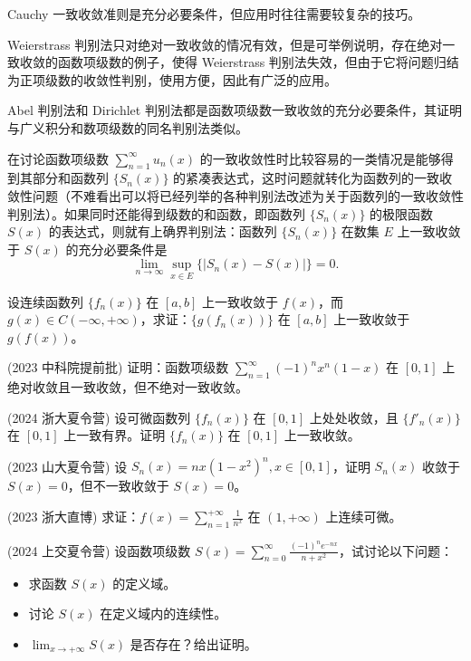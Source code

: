 \documentclass[lang=cn,10pt,thmcnt=section]{elegantbook}
\begin{document}
Cauchy 一致收敛准则是充分必要条件，但应用时往往需要较复杂的技巧。

Weierstrass 判别法只对绝对一致收敛的情况有效，但是可举例说明，存在绝对一致收敛的函数项级数的例子，使得 Weierstrass 判别法失效，但由于它将问题归结为正项级数的收敛性判别，使用方便，因此有广泛的应用。

Abel 判别法和 Dirichlet 判别法都是函数项级数一致收敛的充分必要条件，其证明与广义积分和数项级数的同名判别法类似。

在讨论函数项级数 $\sum_{n=1}^{\infty} u_n(x)$ 的一致收敛性时比较容易的一类情况是能够得到其部分和函数列 $\{S_n(x)\}$ 的紧凑表达式，这时问题就转化为函数列的一致收敛性问题（不难看出可以将已经列举的各种判别法改述为关于函数列的一致收敛性判别法）。如果同时还能得到级数的和函数，即函数列 $\{S_n(x)\}$ 的极限函数 $S(x)$ 的表达式，则就有上确界判别法：函数列 $\{S_n(x)\}$ 在数集 $E$ 上一致收敛于 $S(x)$ 的充分必要条件是
\[
\lim_{n \to \infty} \sup_{x \in E} \{|S_n(x) - S(x)|\} = 0.
\]

\begin{example}
设连续函数列 $\{f_n(x)\}$ 在 $[a,b]$ 上一致收敛于 $f(x)$，而 $g(x) \in C(-\infty, +\infty)$，求证：$\{g(f_n(x))\}$ 在 $[a,b]$ 上一致收敛于 $g(f(x))$。
\end{example}

\begin{example}
(2023 中科院提前批) 证明：函数项级数 $\sum_{n=1}^{\infty} (-1)^n x^n (1-x)$ 在 $[0,1]$ 上绝对收敛且一致收敛，但不绝对一致收敛。
\end{example}

\begin{example}
(2024 浙大夏令营) 设可微函数列 $\{f_n(x)\}$ 在 $[0,1]$ 上处处收敛，且 $\{f'_n(x)\}$ 在 $[0,1]$ 上一致有界。证明 $\{f_n(x)\}$ 在 $[0,1]$ 上一致收敛。
\end{example}

\begin{example}
(2023 山大夏令营) 设 $S_n(x) = nx(1-x^2)^n, x \in [0,1]$，证明 $S_n(x)$ 收敛于 $S(x) = 0$，但不一致收敛于 $S(x) = 0$。
\end{example}

\begin{example}
(2023 浙大直博) 求证：$f(x) = \sum_{n=1}^{+\infty} \frac{1}{n^x}$ 在 $(1, +\infty)$ 上连续可微。
\end{example}

\begin{example}
(2024 上交夏令营) 设函数项级数 $S(x) = \sum_{n=0}^{\infty} \frac{(-1)^n e^{-nx}}{n+x^2}$，试讨论以下问题：
\begin{itemize}
    \item 求函数 $S(x)$ 的定义域。
    \item 讨论 $S(x)$ 在定义域内的连续性。
    \item $\lim_{x \to +\infty} S(x)$ 是否存在？给出证明。
\end{itemize}
\end{example}
\end{document}
